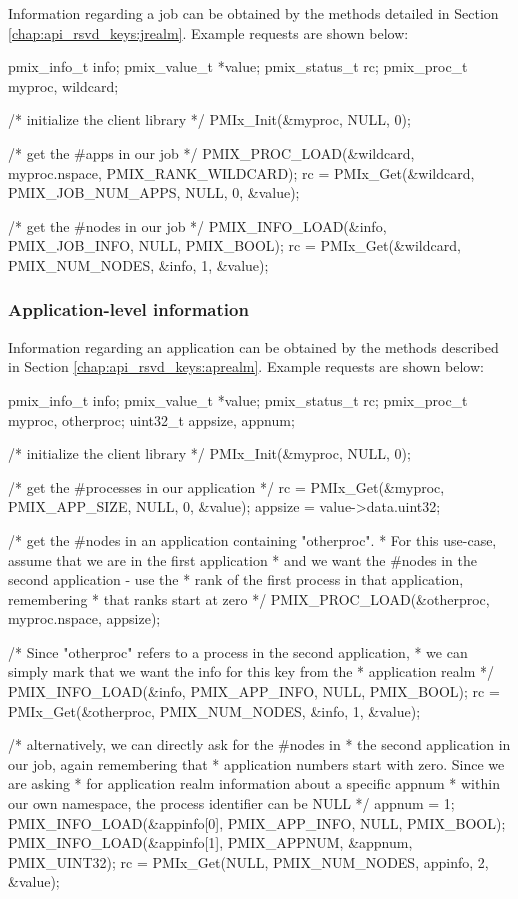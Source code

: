 Information regarding a job can be obtained by the methods detailed in Section \ref{chap:api_rsvd_keys:jrealm}. Example requests are shown below:

\cspecificstart
\begin{codepar}
pmix_info_t info;
pmix_value_t *value;
pmix_status_t rc;
pmix_proc_t myproc, wildcard;

/* initialize the client library */
PMIx_Init(&myproc, NULL, 0);

/* get the #apps in our job */
PMIX_PROC_LOAD(&wildcard, myproc.nspace, PMIX_RANK_WILDCARD);
rc = PMIx_Get(&wildcard, PMIX_JOB_NUM_APPS, NULL, 0, &value);

/* get the #nodes in our job */
PMIX_INFO_LOAD(&info, PMIX_JOB_INFO, NULL, PMIX_BOOL);
rc = PMIx_Get(&wildcard, PMIX_NUM_NODES, &info, 1, &value);
\end{codepar}
\cspecificend


\subsubsection{Application-level information}

Information regarding an application can be obtained by the methods described in Section \ref{chap:api_rsvd_keys:aprealm}. Example requests are shown below:

\cspecificstart
\begin{codepar}
pmix_info_t info;
pmix_value_t *value;
pmix_status_t rc;
pmix_proc_t myproc, otherproc;
uint32_t appsize, appnum;

/* initialize the client library */
PMIx_Init(&myproc, NULL, 0);

/* get the #processes in our application */
rc = PMIx_Get(&myproc, PMIX_APP_SIZE, NULL, 0, &value);
appsize = value->data.uint32;

/* get the #nodes in an application containing "otherproc".
 * For this use-case, assume that we are in the first application
 * and we want the #nodes in the second application - use the
 * rank of the first process in that application, remembering
 * that ranks start at zero */
PMIX_PROC_LOAD(&otherproc, myproc.nspace, appsize);

/* Since "otherproc" refers to a process in the second application,
 * we can simply mark that we want the info for this key from the
 * application realm */
PMIX_INFO_LOAD(&info, PMIX_APP_INFO, NULL, PMIX_BOOL);
rc = PMIx_Get(&otherproc, PMIX_NUM_NODES, &info, 1, &value);

/* alternatively, we can directly ask for the #nodes in
 * the second application in our job, again remembering that
 * application numbers start with zero. Since we are asking
 * for application realm information about a specific appnum
 * within our own namespace, the process identifier can be NULL */
appnum = 1;
PMIX_INFO_LOAD(&appinfo[0], PMIX_APP_INFO, NULL, PMIX_BOOL);
PMIX_INFO_LOAD(&appinfo[1], PMIX_APPNUM, &appnum, PMIX_UINT32);
rc = PMIx_Get(NULL, PMIX_NUM_NODES, appinfo, 2, &value);
\end{codepar}
\cspecificend


